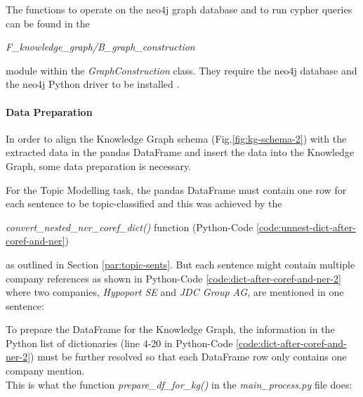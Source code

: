 The functions to operate on the neo4j graph database and to run \gls{cypher} queries can be found in the
\begin{center}
    \emph{F\_knowledge\_graph/B\_graph\_construction}
\end{center}
module within the \emph{GraphConstruction} class.
They require the neo4j database and the neo4j Python driver to be installed \cite{neo4j}.

\paragraph{Data Preparation}
In order to align the Knowledge Graph schema (Fig.\ref{fig:kg-schema-2}) with the extracted data in the pandas DataFrame and insert the data into the Knowledge Graph, some data preparation is necessary.

For the Topic Modelling task, the pandas DataFrame must contain one row for each sentence to be topic-classified and this was achieved by the
\begin{center}
\emph{convert\_nested\_ner\_coref\_dict()} function (Python-Code \ref{code:unnest-dict-after-coref-and-ner})
\end{center}
as outlined in Section \ref{par:topic-sents}.
But each sentence might contain multiple company references as shown in Python-Code \ref{code:dict-after-coref-and-ner-2}
where two companies, \emph{Hypoport SE} and \emph{JDC Group AG}, are mentioned in one sentence:


To prepare the DataFrame for the Knowledge Graph, the information in the Python list of dictionaries (line 4-20 in Python-Code \ref{code:dict-after-coref-and-ner-2}) must be further resolved so that each DataFrame row only contains one company mention.\\
This is what the function \emph{prepare\_df\_for\_kg()} in the \emph{main\_process.py} file does:


